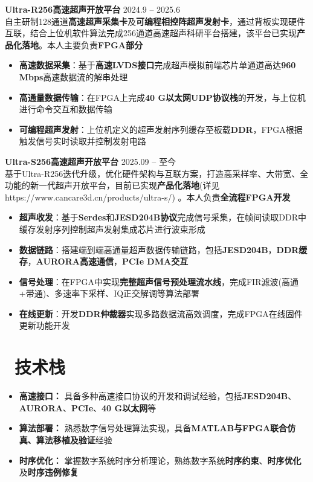 \documentclass[11pt]{article}
\newlength{\interProjectSpacing}
\newcommand{\projectsep}{\vspace{\interProjectSpacing}}
\newlength{\intraProjectTitleSep}
\newcommand{\titlebreak}{\\[\intraProjectTitleSep]}
\newlength{\intraProjectListTopSep}
\begin{document}
\textbf{Ultra-R256高速超声开放平台} \hfill 2024.9 -- 2025.6 \titlebreak
自主研制128通道\textbf{高速超声采集卡}及\textbf{可编程相控阵超声发射卡}，通过背板实现硬件互联，结合上位机软件算法完成256通道高速超声科研平台搭建，该平台已实现\textbf{产品化落地}。本人主要负责\textbf{FPGA部分}
\begin{itemize}[nosep, topsep=\intraProjectListTopSep]
    \item \textbf{高速数据采集}：基于\textbf{高速LVDS接口}完成超声模拟前端芯片单通道高达\textbf{960 Mbps}高速数据流的解串处理
    \item \textbf{高通量数据传输}：在FPGA上完成\textbf{40 G以太网UDP协议栈}的开发，与上位机进行命令交互和数据传输
    \item \textbf{可编程超声发射}：上位机定义的超声发射序列缓存至板载\textbf{DDR}，FPGA根据触发信号实时读取并控制发射电路
\end{itemize}

\projectsep

\textbf{Ultra-S256高速超声开放平台} \hfill 2025.09 -- 至今 \titlebreak
基于Ultra-R256迭代升级，优化硬件架构与互联方案，打造高采样率、大带宽、全功能的新一代超声开放平台，目前已实现\textbf{产品化落地}(详见https://www.cancare3d.cn/products/ultra-s/) 。本人负责\textbf{全流程FPGA开发}
\begin{itemize}[nosep, topsep=\intraProjectListTopSep]
    \item \textbf{超声收发}：基于\textbf{Serdes}和\textbf{JESD204B协议}完成信号采集，在帧间读取DDR中缓存发射序列控制超声发射集成芯片进行波束形成
    \item \textbf{数据链路}：搭建端到端高通量超声数据传输链路，包括\textbf{JESD204B}，\textbf{DDR缓存}，\textbf{AURORA高速通信}，\textbf{PCIe DMA交互}
    \item \textbf{信号处理}：在FPGA中实现\textbf{完整超声信号预处理流水线}，完成FIR滤波(高通+带通)、多速率下采样、IQ正交解调等算法部署
	\item \textbf{在线更新}：开发\textbf{DDR仲裁器}实现多路数据流高效调度，完成FPGA在线固件更新功能开发
\end{itemize}

\section{\makebox[\widthof{\faCogs}][c]{\color{CVBlue}\faCogs}\ 技术栈}
\begin{itemize}[nosep]
    \item \textbf{高速接口：} 具备多种高速接口协议的开发和调试经验，包括\textbf{JESD204B}、\textbf{AURORA}、\textbf{PCIe}、\textbf{40 G以太网}等
    \item \textbf{算法部署：} 熟悉数字信号处理算法实现，具备\textbf{MATLAB与FPGA联合仿真、算法移植及验证}经验
    \item \textbf{时序优化：} 掌握数字系统时序分析理论，熟练数字系统\textbf{时序约束}、\textbf{时序优化}及\textbf{时序违例修复}
\end{itemize}
\end{document}
